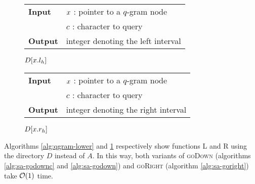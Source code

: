 \begin{figure*}[b!]
\begin{minipage}[b]{.5\textwidth}
\begin{algorithm}[H]
\begin{tabular}{ll}
\textbf{Input}  & $x$ : pointer to a $q$-gram node\\
				& $c$ : character to query\\
\textbf{Output} & integer denoting the left interval\\
\end{tabular}
\begin{algorithmic}[1]
\State \Return $D[x.l_h]$
\end{algorithmic}
\label{alg:qgram-lower}
\end{algorithm}
\end{minipage}
\hfill
\begin{minipage}[b]{.5\textwidth}
\begin{algorithm}[H]
\begin{tabular}{ll}
\textbf{Input}  & $x$ : pointer to a $q$-gram node\\
				& $c$ : character to query\\
\textbf{Output} & integer denoting the right interval\\
\end{tabular}
\begin{algorithmic}[1]
\State \Return $D[x.r_h]$
\end{algorithmic}
\label{alg:qgram-upper}
\end{algorithm}
\end{minipage}
\end{figure*}

Algorithms \ref{alg:qgram-lower} and \ref{alg:qgram-upper} respectively show functions \textsc{L} and \textsc{R} using the directory $D$ instead of $A$.
In this way, both variants of \textsc{goDown} (algorithms \ref{alg:sa-godownc} and \ref{alg:sa-godown}) and \textsc{goRight} (algorithm \ref{alg:sa-goright}) take $\mathcal{O}(1)$ time.

